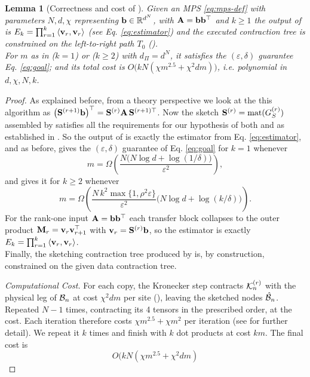 \documentclass[11pt]{article}
\theoremstyle{plain}
\newtheorem{lemma}[theorem]{Lemma}
\theoremstyle{definition}
\theoremstyle{remark}
\begin{document}
\begin{lemma}[Correctness and cost of ]\label{lem:mps-correct}
Given an MPS \eqref{eq:mps-def} with parameters $N,d,\chi$ representing
$\mathbf{\boldsymbol{b}}\in\mathbb{R}^{d^{N}}$, with $\mathbf{A}=\mathbf{\boldsymbol{b}}\mathbf{\boldsymbol{b}}^{\top}$ and $k\ge1$ the output of
 is $E_{k}=\prod_{r=1}^{k}\left\langle \mathbf{\boldsymbol{v}}_r,\mathbf{\boldsymbol{v}}_r \right\rangle$ (see Eq. \eqref{eq:estimator}) and the executed contraction tree is constrained on the left-to-right path $T_0$ (). \\
For $m$ as in  ($k=1$) or
 ($k\ge2$) with $d_{\Pi}=d^{N}$, it satisfies the
$(\varepsilon,\delta)$ guarantee Eq. \eqref{eq:goal}; and its total cost is
$O\!\bigl(kN(\chi m^{2.5}+\chi^{2}dm)\bigr)$, i.e. polynomial in $d,\chi,N,k$.
\end{lemma}
\begin{proof}
As explained before, from a theory perspective we look at the this algorithm as $
\bigl(\mathbf{S}^{(r+1)}\mathbf{\boldsymbol{b}}\bigr)^{\top}
  =\mathbf{S}^{(r)}\mathbf{A}\,\mathbf{S}^{(r+1)\top}$. Now the sketch $\mathbf{S}^{(r)}=\mathrm{mat}(G_S^{(r)})$ assembled by  satisfies all the requirements for our  hypothesis of both  and  as established in \cite[Thm.~3.1, App.~C.1]{masolomonik2022}.
So the output of  is exactly the estimator from Eq. 
\eqref{eq:estimator}, and as before,  gives the $(\varepsilon,\delta)$ guarantee
of Eq. \eqref{eq:goal} for $k=1$ whenever
\[
  m=\Omega\!\left(\frac{N\bigl(N\log d+\log(1/\delta)\bigr)}
    {\varepsilon^{2}}\right),
\]
and  gives it for $k\ge2$ whenever
\[
  m=\Omega\!\left(\frac{N\,k^{2}\max\{1,\rho^{2}\varepsilon\}}
    {\varepsilon^{2}}\bigl(N\log d+\log(k/\delta)\bigr)\right).
\]
For the rank-one input $\mathbf{A}=\mathbf{\boldsymbol{b}}\mathbf{\boldsymbol{b}}^{\top}$ each transfer block collapses to the
outer product $\mathbf{M}_r=\mathbf{\boldsymbol{v}}_r\mathbf{\boldsymbol{v}}_{r+1}^{\top}$ with $\mathbf{\boldsymbol{v}}_r=\mathbf{S}^{(r)}\mathbf{\boldsymbol{b}}$, so the
estimator is exactly $E_k=\prod_{r=1}^{k}\left\langle \mathbf{\boldsymbol{v}}_r,\mathbf{\boldsymbol{v}}_r \right\rangle$.\\
Finally, the sketching contraction tree produced by \cite[Alg.~1]{masolomonik2022} is, by construction, constrained on the given data contraction tree.
\leanok
{}

\medskip\noindent\emph{Computational Cost.} 
For each copy, the Kronecker step contracts $\mathcal{K}_n^{(r)}$ with the
physical leg of $\mathcal{B}_n$ at cost $\chi^{2}dm$ per site
(), leaving the sketched nodes
$\hat{\mathcal{B}}_{n}$. Repeated $N-1$ times, contracting its 4 tensors in the prescribed order, at the cost.
Each iteration therefore costs $\chi m^{2.5}+\chi m^2$ per iteration (see  \cite[Eq.~C.3]{masolomonik2022} for further detail). 
We repeat it $k$ times and finish with $k$ dot products at cost $km$. The final cost is 
$$O(kN(\chi m^{2.5}+\chi^2dm)$$
\end{proof}
\end{document}
